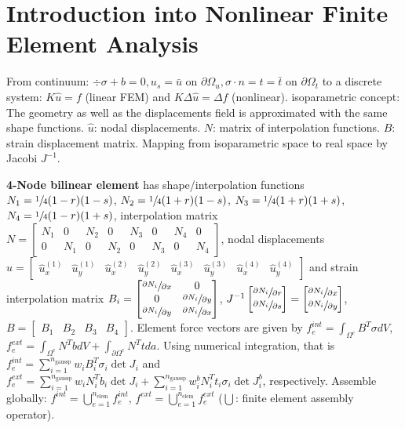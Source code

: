 \section*{Introduction into Nonlinear Finite Element Analysis}

From continuum: $\div{\sigma} + b = 0, u_s = \bar{u} \text{ on } \partial\Omega_u, \sigma \cdot n = t = \bar{t} \text{ on } \partial\Omega_t$
to a discrete system: $K\hat{u}=f$ (linear FEM) and $K\Delta \hat{u} = \Delta f$ (nonlinear).
isoparametric concept: 
The geometry as well as the displacements field is approximated with the same shape functions.
$\hat{u}$: nodal displacements. $N$: matrix of interpolation functions. $B$: strain displacement matrix.
Mapping from isoparametric space to real space by Jacobi $J^{-1}$.

\textbf{4-Node bilinear element}
has shape/interpolation functions $N_1 = \sfrac{1}{4}(1-r)(1-s)$, $N_2 = \sfrac{1}{4}(1+r)(1-s)$, $N_3 = \sfrac{1}{4}(1+r)(1+s)$, $N_4 = \sfrac{1}{4}(1-r)(1+s)$, interpolation matrix $N=
\begin{bmatrix}
N_1 & 0 & N_2 & 0 & N_3 & 0 & N_4 & 0 \\
0 & N_1 & 0 & N_2 & 0 & N_3 & 0 & N_4
\end{bmatrix}$, 
nodal displacements $\hat{u} = \begin{bmatrix}
\hat{u}_x^{(1)} & \hat{u}_y^{(1)} & \hat{u}_x^{(2)} & \hat{u}_y^{(2)} &
\hat{u}_x^{(3)} & \hat{u}_y^{(3)} & \hat{u}_x^{(4)} & \hat{u}_y^{(4)}
\end{bmatrix}$ 
and strain interpolation matrix $B_i = \begin{bmatrix}
\sfrac{\partial N_i}{\partial x} & 0 \\
0 & \sfrac{\partial N_i}{\partial y} \\
\sfrac{\partial N_i}{\partial y} & \sfrac{\partial N_i}{\partial x} \\
\end{bmatrix}$, 
$J^{-1}\begin{bmatrix}
\sfrac{\partial N_i}{\partial r} \\
\sfrac{\partial N_i}{\partial s}
\end{bmatrix} =\begin{bmatrix}
\sfrac{\partial N_i}{\partial x} \\
\sfrac{\partial N_i}{\partial y}
\end{bmatrix}$, 
$B= \begin{bmatrix}
B_1 & B_2 & B_3 & B_4
\end{bmatrix}$.
Element force vectors are given by
$f_e^{int} = \int_{\Omega^e} B^T \sigma dV$, $f_e^{ext} = \int_{\Omega^e} N^T b  dV + \int_{\partial\Omega^e} N^T t  da$.
Using numerical integration, that is $f_e^{int} = \sum_{i=1}^{n_{\text{gaussp}}} w_i B_i ^T \sigma_i \det{J_i}$ and $f_e^{ext} = \sum_{i=1}^{n_{\text{gaussp}}} w_i N_i ^T b_i \det{J_i} + \sum_{i=1}^{n_{\text{gaussp}}} w_i^b N_i ^T t_i \sigma_i \det{J_i^b}$, respectively.
Assemble globally: $f^{int} = \bigcup_{e=1}^{n_{\text{elem}}} f_e^{int}$,  $f^{ext} = \bigcup_{e=1}^{n_{\text{elem}}} f_e^{ext}$ ($\bigcup$: finite element assembly operator).

